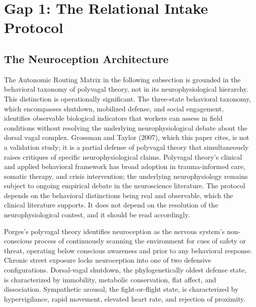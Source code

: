 \documentclass[12pt, letterpaper]{article}
\begin{document}
\clearpage
\section{Gap 1: The Relational Intake Protocol}

\subsection{The Neuroception Architecture}

The Autonomic Routing Matrix in the following subsection is grounded in the behavioral taxonomy of polyvagal theory, not in its neurophysiological hierarchy. This distinction is operationally significant. The three-state behavioral taxonomy, which encompasses shutdown, mobilized defense, and social engagement, identifies observable biological indicators that workers can assess in field conditions without resolving the underlying neurophysiological debate about the dorsal vagal complex. Grossman and Taylor (2007), which this paper cites, is not a validation study; it is a partial defense of polyvagal theory that simultaneously raises critiques of specific neurophysiological claims. Polyvagal theory's clinical and applied behavioral framework has broad adoption in trauma-informed care, somatic therapy, and crisis intervention; the underlying neurophysiology remains subject to ongoing empirical debate in the neuroscience literature. The protocol depends on the behavioral distinctions being real and observable, which the clinical literature supports. It does not depend on the resolution of the neurophysiological contest, and it should be read accordingly.

Porges's polyvagal theory identifies neuroception as the nervous system's non-conscious process of continuously scanning the environment for cues of safety or threat, operating below conscious awareness and prior to any behavioral response. Chronic street exposure locks neuroception into one of two defensive configurations. Dorsal-vagal shutdown, the phylogenetically oldest defense state, is characterized by immobility, metabolic conservation, flat affect, and dissociation. Sympathetic arousal, the fight-or-flight state, is characterized by hypervigilance, rapid movement, elevated heart rate, and rejection of proximity.
\end{document}
